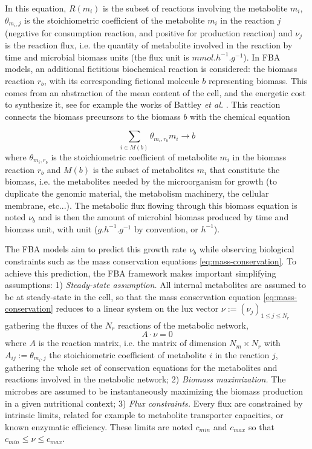 \documentclass{article}
\begin{document}
In this equation, $R(m_i)$ is the subset of reactions involving the metabolite $m_i$, $\theta_{m_i,j}$ is the stoichiometric coefficient of the metabolite $m_i$ in the reaction $j$ (negative for consumption reaction, and positive for production reaction) and $\nu_{j}$ is the reaction flux, i.e. the quantity of metabolite involved in the reaction by time and microbial biomass units (the flux unit is $m mol.h^{-1}.g^{-1}$). In FBA models, an additional fictitious biochemical reaction is considered: the biomass reaction $r_b$, with its corresponding fictional molecule $b$ representing biomass. This comes from an abstraction of the mean content of the cell, and the energetic cost to synthesize it, see for example the works of Battley \textit{et al. }\cite{battley1998development}. This reaction connects the biomass precursors to the biomass $b$ with the chemical equation

\[ \sum_{ i \in M(b)} \theta_{m_i,r_b} m_i \to b \]
where $\theta_{m_i,r_b}$ is the stoichiometric coefficient of metabolite $m_i$ in the biomass reaction $r_b$ and $M(b)$ is the subset of metabolites $m_i$ that constitute the biomass, i.e. the metabolites needed by the microorganism for growth (to duplicate the genomic material, the metabolism machinery, the cellular membrane, etc...). The metabolic flux flowing through this biomass equation is noted $\nu_b$ and is then the amount of microbial biomass produced by time and biomass unit, with unit ($g.h^{-1}.g^{-1}$ by convention, or $h^{-1}$).


The FBA models aim to predict this growth rate $\nu_b$ while observing biological constraints such as the mass conservation equations \eqref{eq:mass-conservation}. To achieve this prediction, the FBA framework makes important simplifying assumptions: 1) \textit{Steady-state assumption.} All internal metabolites are assumed to be at steady-state in the cell, so that the mass conservation equation \eqref{eq:mass-conservation} reduces to a linear system on the lux vector $\nu := (\nu_j)_{1\leqslant j \leqslant N_r}$ gathering the fluxes of the $N_r$ reactions of the metabolic network,  
\[A \cdot \nu = 0\]
where $A$ is the reaction matrix, i.e. the matrix of dimension $N_m \times N_r$ with $A_{ij} := \theta_{m_i,j}$ the stoichiometric coefficient of metabolite $i$ in the reaction $j$, gathering the whole set of conservation equations for the metabolites and reactions involved in the metabolic network; 2) \textit{Biomass maximization.} The microbes are assumed to be instantaneously maximizing the biomass production in a given nutritional context; 3) \textit{Flux constraints.} Every flux are constrained by intrinsic limits, related for example to metabolite transporter capacities, or known enzymatic efficiency. These limits are noted $c_{min}$ and $c_{max}$ so that $c_{min} \leq \nu \leq c_{max}$.
\end{document}
